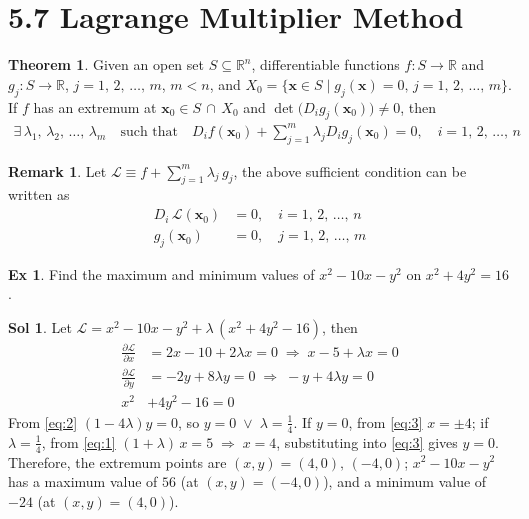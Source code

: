 \documentclass[12pt]{extarticle}
\newcommand{\ds}{\displaystyle}
\newcommand{\ie}{\;\Longrightarrow\;}
\newcommand{\orr}{\;\vee\;}
\theoremstyle{definition}
\newtheorem*{thm}{Theorem}
\newtheorem*{ex}{Ex}
\newtheorem*{sol}{Sol}
\newtheorem*{rmk}{Remark}
\newcommand{\vx}{\mathbf{x}}
\newcommand{\pdiff}[2]{\frac{\partial #1}{\partial #2}}
\begin{document}
\section*{5.7 Lagrange Multiplier Method}

\begin{thm}
  Given an open set $S\subseteq\mathbb{R}^n$, differentiable functions $f:S\to\mathbb{R}$ and $g_j:S\to\mathbb{R}$, $j=1,\,2,\,\ldots,\,m$, $m < n$, and $\ds X_0 = \big\{\vx\in S\;|\;g_j(\vx) = 0,\,j=1,\,2,\,\ldots,\,m\big\}$. If $f$ has an extremum at $\ds\vx_0\in S\,\cap\,X_0$ and $\det\big(D_i g_j(\vx_0)\big)\ne 0$, then \vspace{-2mm}
  \begin{align*}
    \exists\,\lambda_1,\,\lambda_2,\,\ldots,\,\lambda_m\quad\text{such that}\quad D_i f(\vx_0) + \sum_{j = 1}^m\lambda_j D_i g_j(\vx_0) = 0,\quad\ds i = 1,\,2,\,\ldots,\,n
  \end{align*}
\end{thm}
\begin{rmk}
  Let $\ds\mathcal{L}\equiv f + \sum_{j = 1}^m \lambda_j\,g_j$, the above sufficient condition can be written as
  \vspace{-2mm}
  \begin{align*}
    D_i\,\mathcal{L}(\vx_0) &= 0,\quad i = 1,\,2,\,\ldots,\,n \\
    g_j(\vx_0) &= 0,\quad j=1,\,2,\,\ldots,\,m
  \end{align*}
\end{rmk}

\begin{ex} 
  Find the maximum and minimum values of $\ds x^2 - 10 x - y^2$ on $\ds x^2 + 4 y^2 = 16$. 
\end{ex}

\begin{sol}
  Let $\ds\mathcal{L} = x^2 - 10 x - y^2 + \lambda\,(x^2 + 4 y^2 - 16)$, then 
  \begin{align}
    \pdiff{\mathcal{L}}{x} &= 2 x - 10 + 2\lambda x = 0\ie x - 5 + \lambda x = 0 \label{eq:1}\\
    \pdiff{\mathcal{L}}{y} &= -2y + 8\lambda y = 0\ie -y + 4\lambda y = 0 \label{eq:2} \\
    x^2 &+ 4 y^2 - 16 = 0 \label{eq:3}
  \end{align}
  From \eqref{eq:2} $(1 - 4\lambda) y = 0$, so $y = 0\orr\lambda = \frac{1}{4}$. If $y = 0$, from \eqref{eq:3} $x = \pm 4$; if $\lambda=\frac{1}{4}$, from \eqref{eq:1} $(1 + \lambda)\,x = 5\ie x = 4$, substituting into \eqref{eq:3} gives $y = 0$. Therefore, the extremum points are $(x, y) = (4, 0),\,(-4, 0)$; $x^2 - 10x - y^2$ has a maximum value of $56$ (at $(x, y) = (-4, 0)$), and a minimum value of $-24$ (at $(x, y) = (4, 0)$). 
\end{sol}
\end{document}
